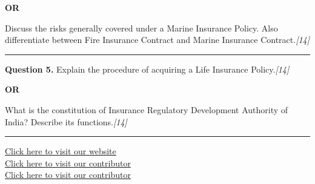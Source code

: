 \documentclass[11pt,a4paper]{article}
\newcommand{\pts}[1]{\hfill   \textit{[#1]}}
\begin{document}
\centerline{   \textbf{OR}}

Discuss the risks generally covered under a Marine Insurance Policy. Also differentiate between Fire Insurance Contract and Marine Insurance Contract.\pts{14}

\medskip\rule{\linewidth}{0.2pt}




\noindent   \textbf{Question 5.}
Explain the procedure of acquiring a Life Insurance Policy.\pts{14}

\centerline{   \textbf{OR}}

What is the constitution of Insurance Regulatory Development Authority of India? Describe its functions.\pts{14}

\vfill
\rule{\linewidth}{0.4pt}

\begin{center}\small
\href{https://bhu-exam.vercel.app/}{Click here to visit our website}\\[4pt]
\href{https://me-aryan.vercel.app/}{Click here to visit our contributor}\\[4pt]
\href{https://quashan-me.vercel.app/}{Click here to visit our contributor}
\end{center}
\end{document}
